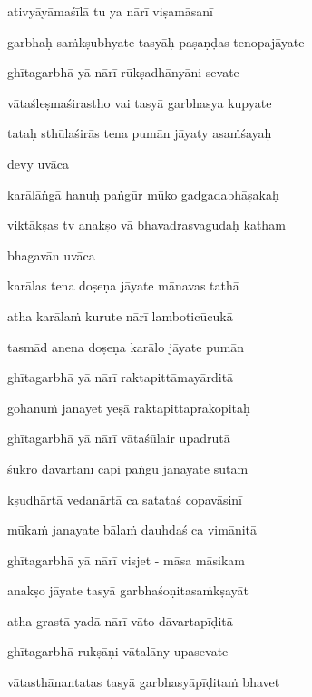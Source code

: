 ativyāyāmaśīlā tu ya nārī viṣamāsanī \veg\dontdisplaylinenum

garbhaḥ sa\.mkṣubhyate tasyāḥ paṣaṇḍas tenopajāyate\thinspace{\dandab} \dontdisplaylinenum

ghītagarbhā yā nārī rūkṣadhānyāni sevate \veg\dontdisplaylinenum

vātaśleṣmaśirastho vai tasyā garbhasya kupyate\thinspace{\dandab} \dontdisplaylinenum

tataḥ sthūlaśirās tena pumān jāyaty asa\.mśayaḥ \veg\dontdisplaylinenum

devy uvāca~{\dandab}\dontdisplaylinenum 

karālāṅgā hanuḥ paṅgūr mūko gadgadabhāṣakaḥ\thinspace{\danda} \dontdisplaylinenum

viktākṣas tv anakṣo vā bhavadrasvagudaḥ katham \veg\dontdisplaylinenum

bhagavān uvāca~{\dandab}\dontdisplaylinenum 

karālas tena doṣeṇa jāyate mānavas tathā\thinspace{\danda} \dontdisplaylinenum

atha karāla\.m kurute nārī lamboticūcukā \danda\dontdisplaylinenum

tasmād anena doṣeṇa karālo jāyate pumān \veg\dontdisplaylinenum

ghītagarbhā yā nārī raktapittāmayārditā\thinspace{\dandab} \dontdisplaylinenum

gohanu\.m janayet yeṣā raktapittaprakopitaḥ \veg\dontdisplaylinenum

ghītagarbhā yā nārī vātaśūlair upadrutā\thinspace{\dandab} \dontdisplaylinenum

śukro dāvartanī cāpi paṅgū janayate sutam \veg\dontdisplaylinenum

kṣudhārtā vedanārtā ca satataś copavāsinī\thinspace{\dandab} \dontdisplaylinenum

mūka\.m janayate bāla\.m dauhdaś ca vimānitā \veg\dontdisplaylinenum

ghītagarbhā yā nārī visjet - māsa māsikam\thinspace{\dandab} \dontdisplaylinenum

anakṣo jāyate tasyā garbhaśoṇitasa\.mkṣayāt \veg\dontdisplaylinenum

atha grastā yadā nārī vāto dāvartapīḍitā\thinspace{\dandab} \dontdisplaylinenum

ghītagarbhā rukṣāṇi vātalāny upasevate \veg\dontdisplaylinenum

vātasthānantatas tasyā garbhasyāpīḍita\.m bhavet\thinspace{\dandab} \dontdisplaylinenum

